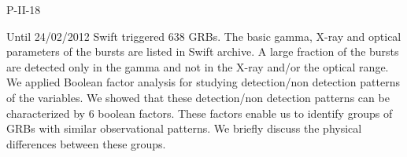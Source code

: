 P-II-18


\bigskip



\bigskip

\noindent Until 24/02/2012 Swift triggered 638 GRBs.  The basic gamma, X-ray and optical parameters of the bursts are listed in Swift archive.  A large fraction of the bursts are detected only in the gamma and not in the X-ray and/or the optical range.  We applied Boolean factor analysis for studying detection/non detection patterns of the variables.  We showed that these detection/non detection patterns can be characterized by 6 boolean factors.  These factors enable us to identify groups of GRBs with similar observational patterns.  We briefly discuss the physical differences between these groups.

